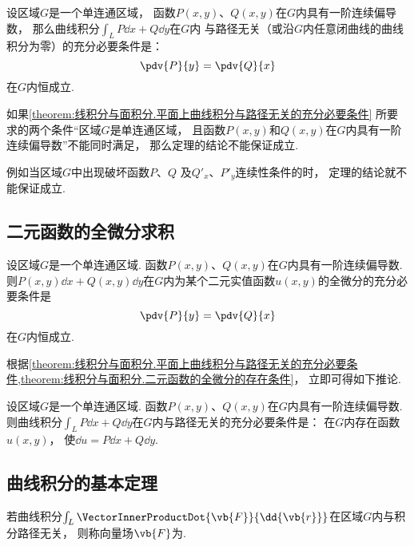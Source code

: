 \begin{theorem}\label{theorem:线积分与面积分.平面上曲线积分与路径无关的充分必要条件}
设区域\(G\)是一个单连通区域，
函数\(P(x,y)\)、\(Q(x,y)\)在\(G\)内具有一阶连续偏导数，
那么曲线积分\(\int_L P\dd{x}+Q\dd{y}\)在\(G\)内
与路径无关（或沿\(G\)内任意闭曲线的曲线积分为零）的充分必要条件是：\begin{equation*}
	\pdv{P}{y}=\pdv{Q}{x}
\end{equation*}在\(G\)内恒成立.
\end{theorem}

如果\cref{theorem:线积分与面积分.平面上曲线积分与路径无关的充分必要条件}
所要求的两个条件“区域\(G\)是单连通区域，
且函数\(P(x,y)\)和\(Q(x,y)\)在\(G\)内具有一阶连续偏导数”不能同时满足，
那么定理的结论不能保证成立.

例如当区域\(G\)中出现破坏函数\(P\)、\(Q\)
及\(Q'_x\)、\(P'_y\)连续性条件的时，
定理的结论就不能保证成立.

\subsection{二元函数的全微分求积}
\begin{theorem}\label{theorem:线积分与面积分.二元函数的全微分的存在条件}
设区域\(G\)是一个单连通区域.
函数\(P(x,y)\)、\(Q(x,y)\)在\(G\)内具有一阶连续偏导数.
则\(P(x,y)\dd{x}+Q(x,y)\dd{y}\)在\(G\)内为某个二元实值函数\(u(x,y)\)的全微分的充分必要条件是\begin{equation*}
	\pdv{P}{y}=\pdv{Q}{x}
\end{equation*}在\(G\)内恒成立.
\end{theorem}

根据\cref{theorem:线积分与面积分.平面上曲线积分与路径无关的充分必要条件,theorem:线积分与面积分.二元函数的全微分的存在条件}，
立即可得如下推论.
\begin{corollary}
设区域\(G\)是一个单连通区域.
函数\(P(x,y)\)、\(Q(x,y)\)在\(G\)内具有一阶连续偏导数.
则曲线积分\(\int_L P\dd{x}+Q\dd{y}\)在\(G\)内与路径无关的充分必要条件是：
在\(G\)内存在函数\(u(x,y)\)，
使\(\dd{u}=P\dd{x}+Q\dd{y}\).
\end{corollary}

\subsection{曲线积分的基本定理}
\begin{definition}
若曲线积分\(\int_L \VectorInnerProductDot{\vb{F}}{\dd{\vb{r}}}\)在区域\(G\)内与积分路径无关，
则称向量场\(\vb{F}\)为.
\end{definition}

